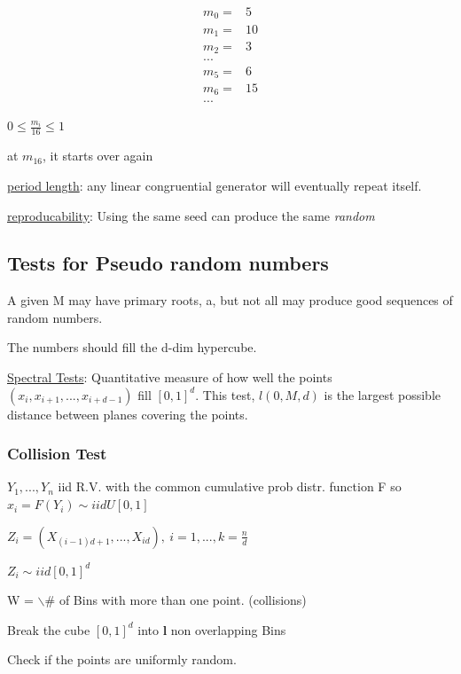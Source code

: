 \documentclass[11pt]{article}
\begin{document}
\begin{equation}
\begin{split}
m_0 = & 5\\
m_1 = & 10\\
m_2 = & 3\\
...\\
m_5 = & 6\\
m_6 = & 15\\
...
\end{split}
\end{equation}


\(0 \leq \frac{m_i}{16} \leq 1\)

at \(m_16\), it starts over again

\uline{period length}: any linear congruential generator will eventually repeat
itself.

\uline{reproducability}: Using the same seed can produce the same \emph{random}

\subsection{Tests for Pseudo random numbers}
\label{sec:orgc953797}

A given M may have primary roots, a, but not all may produce good sequences of
random numbers.

The numbers should fill the d-dim hypercube.

\uline{Spectral Tests}: Quantitative measure of how well the points \((x_i, x_{i + 1},
..., x_{i + d - 1})\) fill \([0,1]^d\). This test, \(l(0, M, d)\) is the largest
possible distance between planes covering the points.


\subsubsection{Collision Test}
\label{sec:org2f09d0d}

\(Y_1, ..., Y_n\) iid R.V. with the common cumulative prob distr. function F so
\(x_i = F(Y_i) \sim iid U[0, 1]\)


\(Z_i = (X_{(i - 1)d + 1}, ..., X_{id}), \ i = 1, ..., k = \frac{n}{d}\)

\(Z_i \sim iid [0,1]^d\)

W = $\backslash$# of Bins with more than one point. (collisions)

Break the cube \([0,1]^d\) into \textbf{l} non overlapping Bins

Check if the points are uniformly random.
\end{document}
